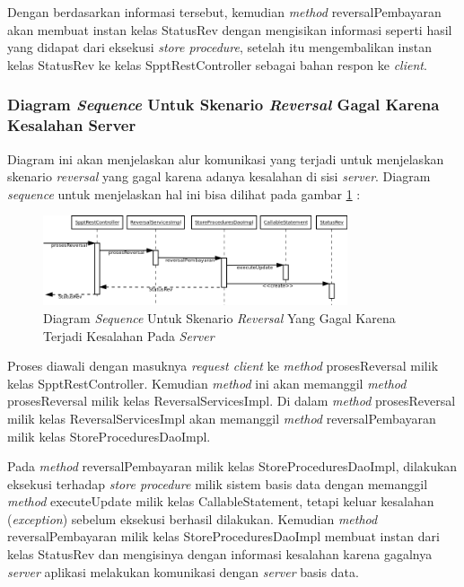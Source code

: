\documentclass[pdftex,12pt, oneside]{article}
\begin{document}
Dengan berdasarkan informasi tersebut, kemudian \textit{method} reversalPembayaran akan membuat instan kelas StatusRev dengan mengisikan informasi seperti hasil yang didapat dari eksekusi \textit{store procedure}, setelah itu mengembalikan instan kelas StatusRev ke kelas SpptRestController sebagai bahan respon ke \textit{client}.

\subsubsection{Diagram \textit{Sequence} Untuk Skenario \textit{Reversal} Gagal Karena Kesalahan Server}

Diagram ini akan menjelaskan alur komunikasi yang terjadi untuk menjelaskan skenario \textit{reversal} yang gagal karena adanya kesalahan di sisi \textit{server}. Diagram \textit{sequence} untuk menjelaskan hal ini bisa dilihat pada gambar \ref{fig:uml-seq-rev-db-error} :

\begin{figure}[H]
  \centering
  \includegraphics[width=0.8\textwidth]{./resources/uml/uml-seq-rev-db-error}
  \caption{Diagram \textit{Sequence} Untuk Skenario \textit{Reversal} Yang Gagal Karena Terjadi Kesalahan Pada \textit{Server}}
  \label{fig:uml-seq-rev-db-error}
\end{figure}

Proses diawali dengan masuknya \textit{request client} ke \textit{method} prosesReversal milik kelas SpptRestController. Kemudian \textit{method} ini akan memanggil \textit{method} prosesReversal milik kelas ReversalServicesImpl. Di dalam \textit{method} prosesReversal milik kelas ReversalServicesImpl akan memanggil \textit{method} reversalPembayaran milik kelas StoreProceduresDaoImpl.

Pada \textit{method} reversalPembayaran milik kelas StoreProceduresDaoImpl, dilakukan eksekusi terhadap \textit{store procedure} milik sistem basis data dengan memanggil \textit{method} executeUpdate milik kelas CallableStatement, tetapi keluar kesalahan (\textit{exception}) sebelum eksekusi berhasil dilakukan. Kemudian \textit{method} reversalPembayaran milik kelas StoreProceduresDaoImpl membuat instan dari kelas StatusRev dan mengisinya dengan informasi kesalahan karena gagalnya \textit{server} aplikasi melakukan komunikasi dengan \textit{server} basis data.
\end{document}
